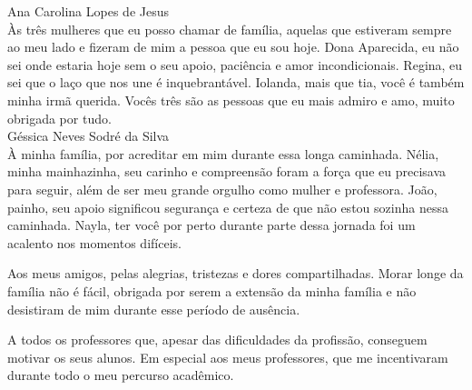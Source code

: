 Ana Carolina Lopes de Jesus
\\

Às três mulheres que eu posso chamar de família, aquelas que estiveram sempre ao meu lado e fizeram de mim a pessoa que eu sou hoje. Dona Aparecida, eu não sei onde estaria hoje sem o seu apoio, paciência e amor incondicionais. Regina, eu sei que o laço que nos une é inquebrantável. Iolanda, mais que tia, você é também minha irmã querida. Vocês três são as pessoas que eu mais admiro e amo, muito obrigada por tudo.
\\

\noindent
Géssica Neves Sodré da Silva
\\

À minha família, por acreditar em mim durante essa longa caminhada. Nélia, minha mainhazinha, seu carinho e compreensão foram a força que eu precisava para seguir, além de ser meu grande orgulho como mulher e professora. João, painho, seu apoio significou segurança e certeza de que não estou sozinha nessa caminhada. Nayla, ter você por perto durante parte dessa jornada foi um acalento nos momentos difíceis.

Aos meus amigos, pelas alegrias, tristezas e dores compartilhadas. Morar longe da família não é fácil, obrigada por serem a extensão da minha família e não desistiram de mim durante esse período de ausência.

A todos os professores que, apesar das dificuldades da profissão, conseguem motivar os seus alunos. Em especial aos meus professores, que me incentivaram durante todo o meu percurso acadêmico.